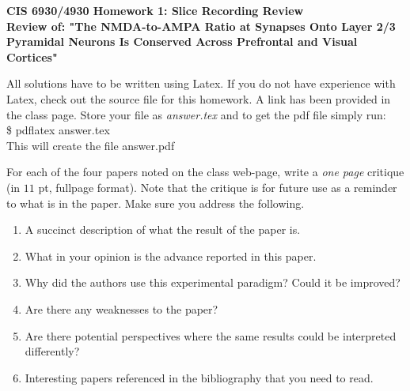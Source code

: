 \documentclass[11pt]{article}
\begin{document}
\begin{center}
{\large {\bf CIS 6930/4930 Homework 1: Slice Recording Review}}\\
{\normalsize {\bf Review of: "The NMDA-to-AMPA Ratio at Synapses Onto Layer 2/3 Pyramidal Neurons
Is Conserved Across Prefrontal and Visual Cortices"}}
\end{center}

All solutions have to be written using Latex. If you do not have experience
with Latex, check out the source file for this homework. A link has been
provided in the class page. Store your file as {\em answer.tex} and to get
the pdf file simply run:\\
\$ pdflatex answer.tex\\
This will create the file answer.pdf

For each of the four papers noted on the class web-page, write a {\em one page}
critique (in $11$ pt, fullpage format). Note that the critique is for future
use as a reminder to what is in the paper. Make sure you address the following.

\begin{enumerate}
\item A succinct description of what the result of the paper is.
\item What in your opinion is the advance reported in this paper.
\item Why did the authors use this experimental paradigm? Could it be improved?
\item Are there any weaknesses to the paper?
\item Are there potential perspectives where the same results could be
interpreted differently?
\item Interesting papers referenced in the bibliography that you need to read.
\end{enumerate}
\end{document}
